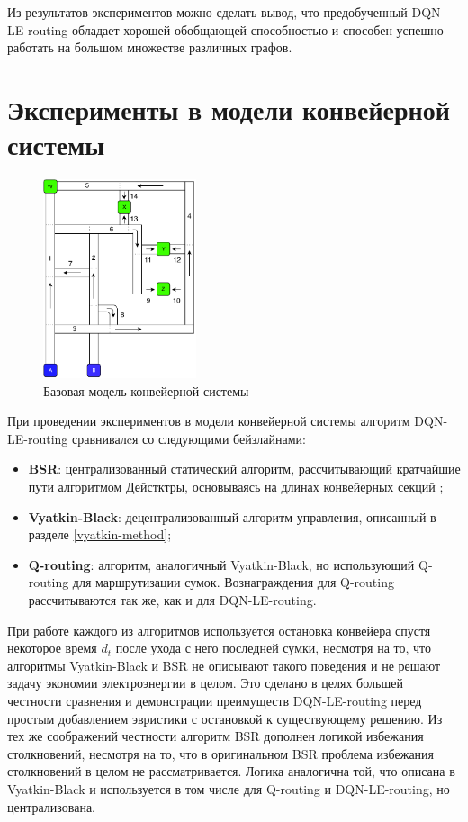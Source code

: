 \documentclass[specification,annotation,times]{itmo-student-thesis}
\theoremstyle{definition}
\begin{document}
Из результатов экспериментов можно сделать вывод, что предобученный DQN-LE-routing обладает
хорошей обобщающей способностью и способен успешно работать на большом множестве
различных графов.

\section{Эксперименты в модели конвейерной системы}\label{experiments:conveyors}

\begin{figure}[!h]
  \caption{Базовая модель конвейерной системы}\label{test-conveyors}
  \centering
  \includegraphics[width=0.4\textwidth]{conveyor-1-illustration-1}
\end{figure}

При проведении экспериментов в модели конвейерной системы алгоритм
DQN-LE-routing сравнивалcя со следующими бейзлайнами:

\begin{itemize}
  \item \textbf{BSR}: централизованный статический алгоритм, рассчитывающий
    кратчайшие пути алгоритмом Дейстктры, основываясь на длинах конвейерных
    секций \cite{johnstone2009status};
  \item \textbf{Vyatkin-Black}: децентрализованный алгоритм управления,
    описанный в разделе \ref{vyatkin-method};
  \item \textbf{Q-routing}: алгоритм, аналогичный Vyatkin-Black, но использующий
    Q-routing для маршрутизации сумок. Вознаграждения для Q-routing
    рассчитываются так же, как и для DQN-LE-routing.
\end{itemize}

При работе каждого из алгоритмов используется остановка конвейера спустя
некоторое время $d_t$ после ухода с него последней сумки, несмотря на то, что
алгоритмы Vyatkin-Black и BSR не описывают такого поведения и не решают задачу
экономии электроэнергии в целом. Это сделано в целях большей честности сравнения
и демонстрации преимуществ DQN-LE-routing перед простым добавлением эвристики с
остановкой к существующему решению. Из тех же соображений честности алгоритм BSR
дополнен логикой избежания столкновений, несмотря на то, что в оригинальном BSR
проблема избежания столкновений в целом не рассматривается. Логика аналогична
той, что описана в Vyatkin-Black и используется в том числе для Q-routing и
DQN-LE-routing, но централизована.
\end{document}
